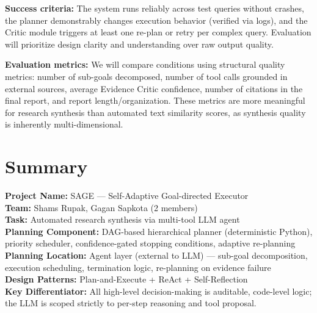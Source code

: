 \documentclass[11pt]{article}
\begin{document}
\textbf{Success criteria:} The system runs reliably across test queries without crashes,
the planner demonstrably changes execution behavior (verified via logs), and the Critic
module triggers at least one re-plan or retry per complex query. Evaluation will
prioritize design clarity and understanding over raw output quality.

\textbf{Evaluation metrics:} We will compare conditions using structural quality metrics: number of sub-goals decomposed, number of tool calls grounded in external sources, average Evidence Critic confidence, number of citations in the final report, and report length/organization. These metrics are more meaningful for research synthesis than automated text similarity scores, as synthesis quality is inherently multi-dimensional.

\section*{Summary}

\begin{tcolorbox}[boxstyle, title={Project Summary}]
\textbf{Project Name:} SAGE --- Self-Adaptive Goal-directed Executor \\
\textbf{Team:} Shams Rupak, Gagan Sapkota (2 members) \\
\textbf{Task:} Automated research synthesis via multi-tool LLM agent \\
\textbf{Planning Component:} DAG-based hierarchical planner (deterministic Python),
priority scheduler, confidence-gated stopping conditions, adaptive re-planning \\
\textbf{Planning Location:} Agent layer (external to LLM) --- sub-goal decomposition,
execution scheduling, termination logic, re-planning on evidence failure \\
\textbf{Design Patterns:} Plan-and-Execute + ReAct + Self-Reflection \\
\textbf{Key Differentiator:} All high-level decision-making is auditable, code-level
logic; the LLM is scoped strictly to per-step reasoning and tool proposal.
\end{tcolorbox}
\end{document}

